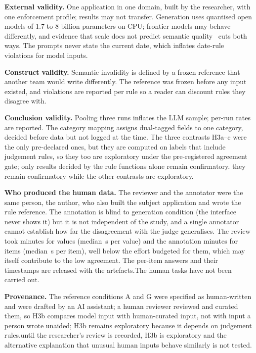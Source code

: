 \documentclass[conference]{IEEEtran}
\begin{document}
\textbf{External validity.} One application in one domain, built by the researcher, with one
enforcement profile; results may not transfer. Generation uses quantised open models of 1.7 to 8
billion parameters on CPU; frontier models may behave differently, and evidence that scale does not
predict semantic quality~\cite{singh2026sob,wrenn2026enterprise} cuts both ways. The prompts never
state the current date, which inflates date-rule violations for model inputs.

\textbf{Construct validity.} Semantic invalidity is defined by a frozen reference that another team
would write differently. The reference was frozen before any input existed, and violations are
reported per rule so a reader can discount rules they disagree with.

\textbf{Conclusion validity.} Pooling three runs inflates the LLM sample; per-run rates are reported.
The category mapping assigns dual-tagged fields to one category, decided before data but not logged
at the time. The three contrasts H3a--c were the only pre-declared ones, but they are computed on labels that
include judgement rules, so\ifjudgeweak{} they too are exploratory under the pre-registered agreement
gate; only results decided by the rule functions alone remain confirmatory.\else{} they remain
confirmatory while the other contrasts are exploratory.\fi

\textbf{Who produced the human data.} \ifhumanlabels The reviewer and the annotator were the same
person, the author, who also built the subject application and wrote the rule reference. The annotation
is blind to generation condition (the interface never shows it) but it is not independent of the study,
and a single annotator cannot establish how far the disagreement with the judge generalises. The review
took  minutes for  values (median \,s per value)
and the annotation  minutes for  items (median \,s per
item), well below the effort budgeted for them, which may itself contribute to the low agreement. The
per-item answers and their timestamps are released with the artefacts.\else The human tasks have not
been carried out.\fi

\textbf{Provenance.} The reference conditions A and G were specified as human-written and were
drafted by an AI assistant; \ifreviewed a human reviewer reviewed and curated them, so H3b compares
model input with human-curated input, not with input a person wrote unaided; H3b remains exploratory
because it depends on judgement rules.\else until the
researcher's review is recorded, H3b is exploratory and the alternative explanation that unusual
human inputs behave similarly is not tested.\fi
\end{document}
